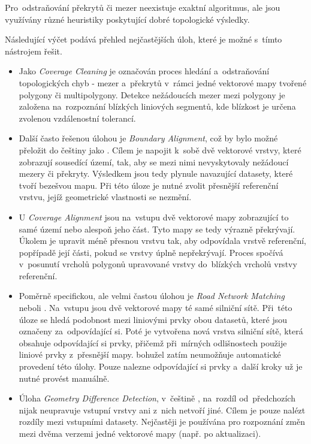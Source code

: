 Pro~odstraňování překrytů či mezer neexistuje exaktní algoritmus,
ale jsou vy\-užívány různé heuristiky poskytující dobré topologické výsledky.

Následující výčet podává přehled nejčastějších úloh, které je možné 
s~tímto nástrojem řešit.

\begin{itemize}
 \item Jako \textit{Coverage Cleaning} je  označován proces hledání
    a~odstraňování topologických chyb - mezer a~překrytů v~rámci jedné
    vektorové mapy tvořené polygony či multipolygony. Detekce nežádoucích
    mezer mezi polygony je založena na~rozpoznání blízkých liniových segmentů,
    kde blízkost je určena zvolenou vzdálenostní to\-le\-rancí. 

 \item Další často řešenou úlohou je \textit{Boundary Alignment}, což by
    bylo možné přeložit do češtiny jako . 
    Cílem je napojit k~sobě dvě vektorové vrstvy, které zobrazují sousedící
    území, tak, aby se mezi nimi nevyskytovaly nežádoucí mezery či překryty.
    Výsledkem jsou tedy plynule navazující datasety, které tvoří bezešvou mapu.
    Při této úloze je nutné zvolit přesnější referenční vrstvu, jejíž 
    geometrické vlastnosti se nezmění.

 \item U \textit{Coverage Alignment} jsou na~vstupu dvě vektorové
    mapy zobrazující to samé území nebo alespoň jeho část. Tyto mapy se 
    tedy výrazně překrývají. Úkolem je upravit méně přesnou vrstvu tak,
    aby odpovídala vrstvě referenční, popřípadě její části, pokud se vrstvy
    úplně nepřekrývají. Proces spočívá v~posunutí vrcholů polygonů upravované
    vrstvy do~blízkých vrcholů vrstvy referenční.

 \item Poměrně specifickou, ale velmi častou úlohou je \textit{Road Network 
    Matching} neboli . Na~vstupu jsou dvě 
    vektorové mapy té samé silniční sítě. Při~této úloze se hledá podobnost
    mezi liniovými prvky obou datasetů, které jsou označeny za~odpovídající si.
    Poté je vytvořena nová vrstva silniční sítě, která obsahuje odpovídající
    si prvky, přičemž při~mírných odlišnostech použije liniové prvky z~přesnější
    mapy.  bohužel zatím neumožňuje automatické provedení této
    úlohy. Pouze nalezne odpovídající si prvky a~další kroky už je nutné provést
    manuálně.

\item Úloha \textit{Geometry Difference Detection}, v~češtině , na~rozdíl od~předchozích nijak neupravuje vstupní
    vrstvy ani z~nich netvoří jiné. Cílem je pouze nalézt rozdíly mezi vstupními
    datasety. Nejčastěji je používána pro rozpoznání změn mezi dvěma verzemi
    jedné vektorové mapy (např. po aktualizaci).
\end{itemize}

